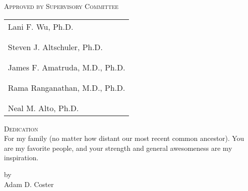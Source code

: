 \begin{titlepage}


\begin{center}

\vspace*{154pt}

\textsc{\Large \myTitle{}}

\vspace{143pt}

\textsc{Approved by Supervisory Committee} \\
\vspace*{22pt}
\end{center}

\begin{flushright}
\begin{tabular}{l}
 \\
 \midrule Lani F. Wu, Ph.D.\\
 \\
 \\
 \midrule Steven J. Altschuler, Ph.D.\\
 \\
 \\
 \midrule James F. Amatruda, M.D., Ph.D.\\
 \\
 \\
 \midrule Rama Ranganathan, M.D., Ph.D.\\
 \\
 \\
 \midrule Neal M. Alto, Ph.D.\\
\end{tabular}
\end{flushright}

\newpage


\vspace*{132pt}
\textsc{\large \centering Dedication}\\

For my family (no matter how distant our most
recent common ancestor). You are my favorite people,
and your strength and general awesomeness are my
inspiration.


\newpage


\vspace*{88pt}
\begin{center}
\textsc{\myTitle}

\vspace*{55pt}
by\\
\vspace*{33pt}
Adam D. Coster\\


\end{center}
\end{titlepage}
